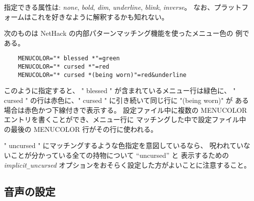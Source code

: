 指定できる属性は:
{\it none}, {\it bold}, {\it dim}, {\it underline},
{\it blink}, {\it inverse}。
なお、プラットフォームはこれを好きなように解釈するかも知れない。

次のものは NetHack の内部パターンマッチング機能を使ったメニュー色の
例である。

\begin{verbatim}
    MENUCOLOR="* blessed *"=green
    MENUCOLOR="* cursed *"=red
    MENUCOLOR="* cursed *(being worn)"=red&underline
\end{verbatim}

このように指定すると、 " blessed " が含まれているメニュー行は緑色に、
" cursed " の行は赤色に、" cursed " に引き続いて同じ行に "(being worn)" が
ある場合は赤色かつ下線付きで表示する。
設定ファイル中に複数の MENUCOLOR エントリを書くことができ、メニュー行に
マッチングした中で設定ファイル中の最後の MENUCOLOR 行がその行に使われる。

" uncursed " にマッチングするような色指定を意図しているなら、
呪われていないことが分かっている全ての持物について ``uncursed'' と
表示するための
{\it implicit\verb+_+uncursed\/}
オプションをおそらく設定した方がよいことに注意すること。

\subsection*{音声の設定}

